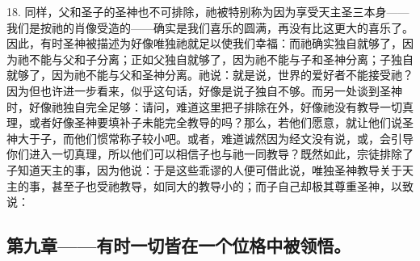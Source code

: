 18. 同样，父和圣子的圣神也不可排除，祂被特别称为因为享受天主圣三本身——我们是按祂的肖像受造的——确实是我们喜乐的圆满，再没有比这更大的喜乐了。因此，有时圣神被描述为好像唯独祂就足以使我们幸福：而祂确实独自就够了，因为祂不能与父和子分离；正如父独自就够了，因为祂不能与子和圣神分离；子独自就够了，因为祂不能与父和圣神分离。祂说：就是说，世界的爱好者不能接受祂？因为但也许进一步看来，似乎这句话，好像是说子独自不够。而另一处谈到圣神时，好像祂独自完全足够：请问，难道这里把子排除在外，好像祂没有教导一切真理，或者好像圣神要填补子未能完全教导的吗？那么，若他们愿意，就让他们说圣神大于子，而他们惯常称子较小吧。或者，难道诚然因为经文没有说，或，会引导你们进入一切真理，所以他们可以相信子也与祂一同教导？既然如此，宗徒排除了子知道天主的事，因为他说：于是这些乖谬的人便可借此说，唯独圣神教导关于天主的事，甚至子也受祂教导，如同大的教导小的；而子自己却极其尊重圣神，以致说：\par


\subsection{第九章——有时一切皆在一个位格中被领悟。}


